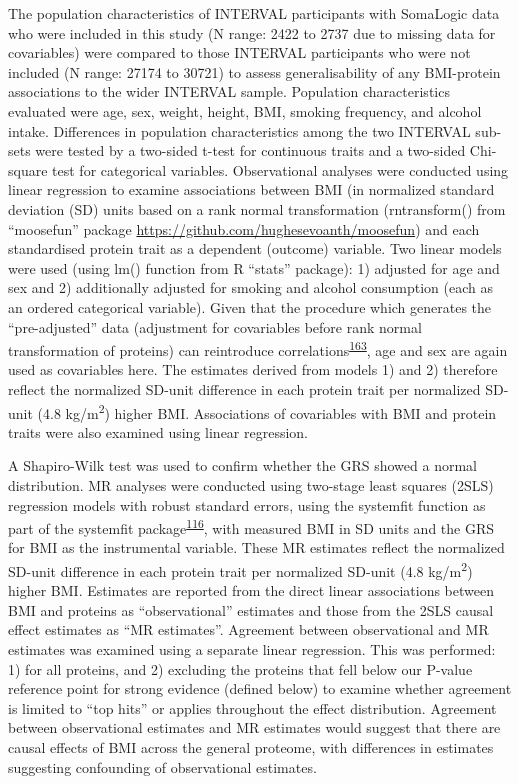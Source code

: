 \documentclass[11pt,twoside]{bristolthesis}
\begin{document}
The population characteristics of INTERVAL participants with SomaLogic data who were included in this study (N range: 2422 to 2737 due to missing data for covariables) were compared to those INTERVAL participants who were not included (N range: 27174 to 30721) to assess generalisability of any BMI-protein associations to the wider INTERVAL sample. Population characteristics evaluated were age, sex, weight, height, BMI, smoking frequency, and alcohol intake. Differences in population characteristics among the two INTERVAL sub-sets were tested by a two-sided t-test for continuous traits and a two-sided Chi-square test for categorical variables. Observational analyses were conducted using linear regression to examine associations between BMI (in normalized standard deviation (SD) units based on a rank normal transformation (rntransform() from ``moosefun'' package \url{https://github.com/hughesevoanth/moosefun}) and each standardised protein trait as a dependent (outcome) variable. Two linear models were used (using lm() function from R ``stats'' package): 1) adjusted for age and sex and 2) additionally adjusted for smoking and alcohol consumption (each as an ordered categorical variable). Given that the procedure which generates the ``pre-adjusted'' data (adjustment for covariables before rank normal transformation of proteins) can reintroduce correlations\textsuperscript{\protect\hyperlink{ref-Pain2018}{163}}, age and sex are again used as covariables here. The estimates derived from models 1) and 2) therefore reflect the normalized SD-unit difference in each protein trait per normalized SD-unit (4.8 kg/m\textsuperscript{2}) higher BMI. Associations of covariables with BMI and protein traits were also examined using linear regression.

A Shapiro-Wilk test was used to confirm whether the GRS showed a normal distribution. MR analyses were conducted using two-stage least squares (2SLS) regression models with robust standard errors, using the systemfit function as part of the systemfit package\textsuperscript{\protect\hyperlink{ref-Henningsen2007}{116}}, with measured BMI in SD units and the GRS for BMI as the instrumental variable. These MR estimates reflect the normalized SD-unit difference in each protein trait per normalized SD-unit (4.8 kg/m\textsuperscript{2}) higher BMI. Estimates are reported from the direct linear associations between BMI and proteins as ``observational'' estimates and those from the 2SLS causal effect estimates as ``MR estimates''. Agreement between observational and MR estimates was examined using a separate linear regression. This was performed: 1) for all proteins, and 2) excluding the proteins that fell below our P-value reference point for strong evidence (defined below) to examine whether agreement is limited to ``top hits'' or applies throughout the effect distribution. Agreement between observational estimates and MR estimates would suggest that there are causal effects of BMI across the general proteome, with differences in estimates suggesting confounding of observational estimates.
\end{document}
